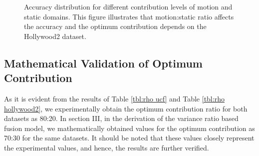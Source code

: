 \begin{figure}
\caption{Accuracy distribution for different contribution levels of motion and static domains.
This figure illustrates that motion:static ratio affects the accuracy and the optimum contribution depends on the Hollywood2 dataset.}
\label{contribution chart}
\end{figure}

\subsection{Mathematical Validation of Optimum Contribution}

As it is evident from the results of Table \ref{tbl:rho ucf} and Table \ref{tbl:rho hollywood2}, we experimentally obtain the
optimum contribution ratio for both datasets as 80:20. In section III, in the derivation of the variance ratio based fusion model,
we mathematically obtained values for the optimum contribution as 70:30 for the same datasets. It should be noted that these values closely
represent the experimental values, and hence, the results are further verified.

